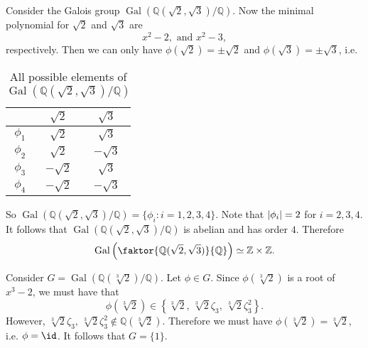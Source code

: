 \documentclass[notoc,notitlepage,nobib]{tufte-book}
\DeclareMathOperator{\Gal}{Gal}
\begin{document}
\begin{eg}
  Consider the Galois group $\Gal( \mathbb{Q}(\sqrt{2}, \sqrt{3}) / \mathbb{Q}
  )$. Now the minimal polynomial for $\sqrt{2}$ and $\sqrt{3}$ are
  \begin{equation*}
    x^2 - 2, \text{ and } x^2 - 3,
  \end{equation*}
  respectively. Then we can only have $\phi(\sqrt{2}) = \pm \sqrt{2}$ and
  $\phi(\sqrt{3}) = \pm \sqrt{3}$, i.e.
  \begin{table}[ht]
    \centering
    \caption{All possible elements of $\Gal(\mathbb{Q}(\sqrt{2}, \sqrt{3}) /
    \mathbb{Q})$}
    \label{table:all_possible_elements_of_gal_q_sqrt_2_sqrt_3_q}
    \begin{tabular}{c | c c}
               & $\sqrt{2}$  & $\sqrt{3}$ \\
       \hline
      $\phi_1$ & $\sqrt{2}$  & $\sqrt{3}$ \\
      $\phi_2$ & $\sqrt{2}$  & $-\sqrt{3}$ \\
      $\phi_3$ & $-\sqrt{2}$ & $\sqrt{3}$ \\
      $\phi_4$ & $-\sqrt{2}$ & $-\sqrt{3}$
    \end{tabular}
  \end{table}
  So $\Gal( \mathbb{Q}(\sqrt{2}, \sqrt{3}) / \mathbb{Q} ) = \{ \phi_i : i = 1,
  2, 3, 4 \}$. Note that $\left|\phi_i\right| = 2$ for $i = 2, 3, 4$. It follows that
  $\Gal( \mathbb{Q}(\sqrt{2}, \sqrt{3}) / \mathbb{Q} )$ is abelian and has order
  $4$. Therefore
  \begin{equation*}
    \Gal \left( \faktor{\mathbb{Q}(\sqrt{2}, \sqrt{3})}{\mathbb{Q}} \right)
    \simeq \mathbb{Z} \times \mathbb{Z}.
  \end{equation*}
\end{eg}


\begin{eg}\label{eg:galois_elements_can_only_permute_roots_in_the_same_field}
  Consider $G = \Gal(\mathbb{Q}(\sqrt[3]{2}) / \mathbb{Q})$. Let $\phi \in G$.
  Since $\phi(\sqrt[3]{2})$ is a root of $x^3 - 2$, we must have that
  \begin{equation*}
    \phi(\sqrt[3]{2}) \in \left\{ \sqrt[3]{2}, \, \sqrt[3]{2} \zeta_3, \,
    \sqrt[3]{2} \zeta_3^2 \right\}.
  \end{equation*}
  However, $\sqrt[3]{2} \zeta_3, \, \sqrt[3]{2} \zeta_3^2 \notin
  \mathbb{Q}(\sqrt[3]{2})$. Therefore we must have $\phi(\sqrt[3]{2}) =
  \sqrt[3]{2}$, i.e. $\phi = \id$. It follows that $G = \{ 1 \}$.
\end{eg} 
\end{document}
